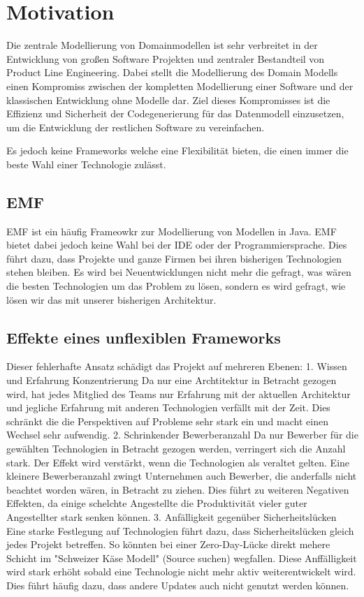 \documentclass[./einleitung.tex]{subfiles}
\begin{document}
\section{Motivation}
Die zentrale Modellierung von Domainmodellen ist sehr verbreitet in der Entwicklung von großen Software Projekten und zentraler Bestandteil von Product Line Engineering. Dabei stellt die Modellierung des Domain Modells einen Kompromiss zwischen der kompletten Modellierung einer Software und der klassischen Entwicklung ohne Modelle dar.
Ziel dieses Kompromisses ist die Effizienz und Sicherheit der Codegenerierung für das Datenmodell einzusetzen, um die Entwicklung der restlichen Software zu vereinfachen.


Es jedoch keine Frameworks welche eine Flexibilität bieten, die einen immer die beste Wahl einer Technologie zulässt.
\subsection{EMF}
EMF ist ein häufig Frameowkr zur Modellierung von Modellen in Java. EMF bietet dabei jedoch keine Wahl bei der IDE oder der Programmiersprache.
Dies führt dazu, dass Projekte und ganze Firmen bei ihren bisherigen Technologien stehen bleiben. Es wird bei Neuentwicklungen nicht mehr die gefragt, was wären die besten Technologien um das Problem zu lösen, sondern es wird gefragt, wie lösen wir das mit unserer bisherigen Architektur. 
\subsection{Effekte eines unflexiblen Frameworks}
Dieser fehlerhafte Ansatz schädigt das Projekt auf mehreren Ebenen:
1. Wissen und Erfahrung Konzentrierung
Da nur eine Archtitektur in Betracht gezogen wird, hat jedes Mitglied des Teams nur Erfahrung mit der aktuellen Architektur und jegliche Erfahrung mit anderen Technologien verfällt mit der Zeit. Dies schränkt die die Perspektiven auf Probleme sehr stark ein und macht einen Wechsel sehr aufwendig.
2. Schrinkender Bewerberanzahl
Da nur Bewerber für die gewählten Technologien in Betracht gezogen werden, verringert sich die Anzahl stark. Der Effekt wird verstärkt, wenn die Technologien als veraltet gelten. Eine kleinere Bewerberanzahl zwingt Unternehmen auch Bewerber, die anderfalls nicht beachtet worden wären, in Betracht zu ziehen. Dies führt zu weiteren Negativen Effekten, da einige schelchte Angestellte die Produktivität vieler guter Angestellter stark senken können.
3. Anfälligkeit gegenüber Sicherheitslücken
Eine starke Festlegung auf Technologien führt dazu, dass Sicherheitslücken gleich jedes Projekt betreffen. So könnten bei einer Zero-Day-Lücke direkt mehere Schicht im "Schweizer Käse Modell" (Source suchen)  wegfallen.
Diese Anffälligkeit wird stark erhöht sobald eine Technologie nicht mehr aktiv weiterentwickelt wird. Dies führt häufig dazu, dass andere Updates auch nicht genutzt werden können.
\end{document}
